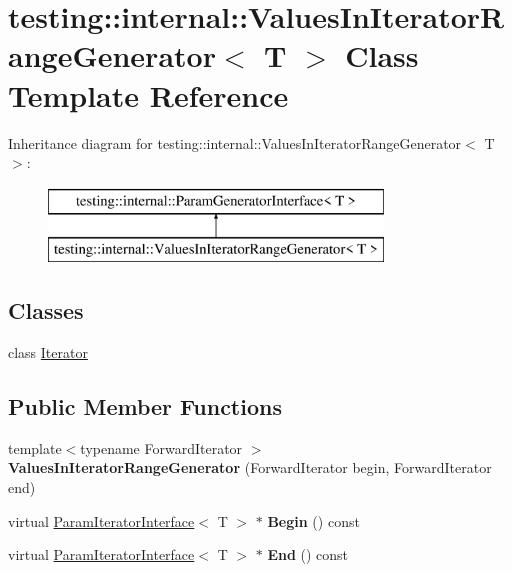 \hypertarget{classtesting_1_1internal_1_1_values_in_iterator_range_generator}{}\section{testing\+:\+:internal\+:\+:Values\+In\+Iterator\+Range\+Generator$<$ T $>$ Class Template Reference}
\label{classtesting_1_1internal_1_1_values_in_iterator_range_generator}
Inheritance diagram for testing\+:\+:internal\+:\+:Values\+In\+Iterator\+Range\+Generator$<$ T $>$\+:\begin{figure}[H]
\begin{center}
\leavevmode
\includegraphics[height=2.000000cm]{classtesting_1_1internal_1_1_values_in_iterator_range_generator}
\end{center}
\end{figure}
\subsection*{Classes}
\begin{DoxyCompactItemize}
\item 
class \mbox{\hyperlink{classtesting_1_1internal_1_1_values_in_iterator_range_generator_1_1_iterator}{Iterator}}
\end{DoxyCompactItemize}
\subsection*{Public Member Functions}
\begin{DoxyCompactItemize}
\item 
\mbox{\label{classtesting_1_1internal_1_1_values_in_iterator_range_generator_a8b30f6028bc5739bbd7c24b0f0e409f7}} 
{\footnotesize template$<$typename Forward\+Iterator $>$ }\\{\bfseries Values\+In\+Iterator\+Range\+Generator} (Forward\+Iterator begin, Forward\+Iterator end)
\item 
\mbox{\label{classtesting_1_1internal_1_1_values_in_iterator_range_generator_a91dac42f069cd06d05348fe5dd78639b}} 
virtual \mbox{\hyperlink{classtesting_1_1internal_1_1_param_iterator_interface}{Param\+Iterator\+Interface}}$<$ T $>$ $\ast$ {\bfseries Begin} () const
\item 
\mbox{\label{classtesting_1_1internal_1_1_values_in_iterator_range_generator_a4af95b9eccfc86c40a715df2d9d0df40}} 
virtual \mbox{\hyperlink{classtesting_1_1internal_1_1_param_iterator_interface}{Param\+Iterator\+Interface}}$<$ T $>$ $\ast$ {\bfseries End} () const
\end{DoxyCompactItemize}
